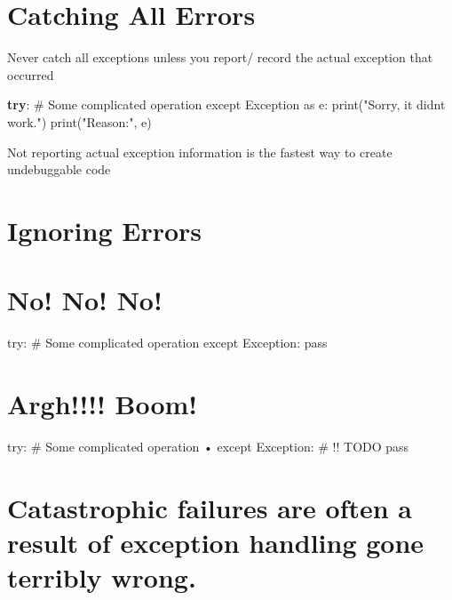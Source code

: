 \documentclass[
  letterpaper,
  DIV=11,
  numbers=noendperiod]{scrreprt}
\newenvironment{Shaded}{\begin{snugshade}}{\end{snugshade}}
\newcommand{\CommentTok}[1]{\textcolor[rgb]{0.37,0.37,0.37}{#1}}
\newcommand{\ControlFlowTok}[1]{\textcolor[rgb]{0.00,0.23,0.31}{\textbf{#1}}}
\newcommand{\NormalTok}[1]{\textcolor[rgb]{0.00,0.23,0.31}{#1}}
\begin{document}

\chapter{Catching All Errors}\label{catching-all-errors}

Never catch all exceptions unless you report/ record the actual
exception that occurred

\begin{Shaded}
\begin{Highlighting}[]
\ControlFlowTok{try}\NormalTok{: }\CommentTok{\# Some complicated operation except Exception as e: print("Sorry, it didn\textquotesingle{}t work.") print("Reason:", e) }
\end{Highlighting}
\end{Shaded}

Not reporting actual exception information is the fastest way to create
undebuggable code


\chapter{Ignoring Errors}\label{ignoring-errors}


\chapter{No! No! No!}\label{no-no-no}

try: \# Some complicated operation except Exception: pass


\chapter{Argh!!!! Boom!}\label{argh-boom}

try: \# Some complicated operation • except Exception: \# !! TODO pass


\chapter{Catastrophic failures are often a result of exception handling
gone terribly
wrong.}\label{catastrophic-failures-are-often-a-result-of-exception-handling-gone-terribly-wrong.}
\end{document}
